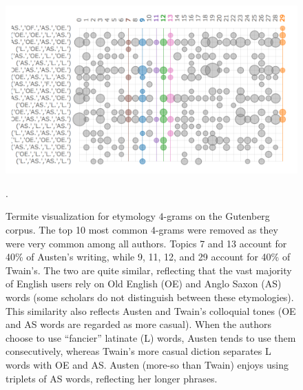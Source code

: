 \documentclass[14pt]{article} %
\theoremstyle{plain}
\theoremstyle{definition}
\theoremstyle{remark}
\begin{document}
\begin{figure}
\centering
\includegraphics[width=0.6\linewidth]{termite2.png}
\caption{Termite visualization for etymology $4$-grams on the Gutenberg corpus. The top 10 most common $4$-grams were removed as they were very common among all authors. Topics 7 and 13 account for 40\% of  Austen's writing, while 9, 11, 12, and 29 account for 40\% of Twain's. The two are quite similar, reflecting that the vast majority of English users rely on Old English (OE) and Anglo Saxon (AS) words (some scholars do not distinguish between these etymologies). This similarity also reflects Austen and Twain's colloquial tones (OE and AS words are regarded as more casual). When the authors choose to use ``fancier'' latinate (L) words, Austen tends to use them consecutively, whereas Twain's more casual diction separates L words with OE and AS. Austen (more-so than Twain) enjoys using triplets of AS words, reflecting her longer phrases.}
\label{fig:termite2}.
\end{figure}

\clearpage
\end{document}
